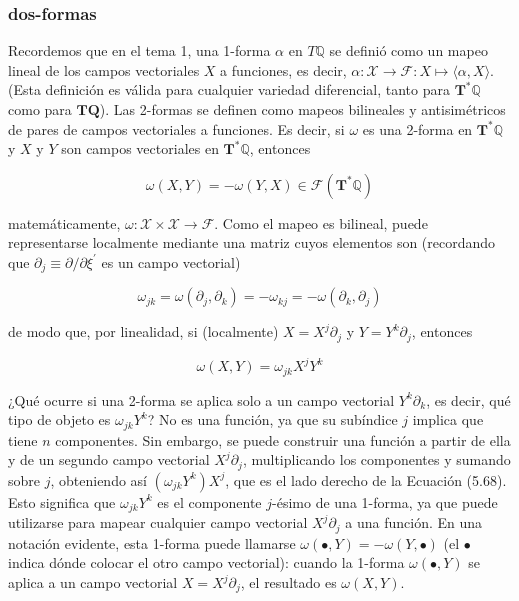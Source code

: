 \subsubsection{dos-formas}
Recordemos que en el tema 1, una 1-forma \( \alpha \) en \( T \mathbb{Q} \) se definió como un mapeo lineal de los campos vectoriales \( X \) a funciones, es decir, \( \alpha: \mathcal{X} \rightarrow \mathcal{F}: X \mapsto \langle \alpha, X \rangle \). (Esta definición es válida para cualquier variedad diferencial, tanto para \( \mathbf{T}^{*} \mathbb{Q} \) como para \( \mathbf{T Q} \)). Las 2-formas se definen como mapeos bilineales y antisimétricos de pares de campos vectoriales a funciones. Es decir, si \( \omega \) es una 2-forma en \( \mathbf{T}^{*} \mathbb{Q} \) y \( X \) y \( Y \) son campos vectoriales en \( \mathbf{T}^{*} \mathbb{Q} \), entonces

$$
\omega(X, Y)=-\omega(Y, X) \in \mathcal{F}\left(\mathbf{T}^{*} \mathbb{Q}\right) \tag{5.66}
$$

matemáticamente, \( \omega: \mathcal{X} \times \mathcal{X} \rightarrow \mathcal{F} \). Como el mapeo es bilineal, puede representarse localmente mediante una matriz cuyos elementos son (recordando que \( \partial_{j} \equiv \partial / \partial \xi^{\prime} \) es un campo vectorial)

$$
\omega_{j k} = \omega\left(\partial_{j}, \partial_{k}\right) = -\omega_{k j} = -\omega\left(\partial_{k}, \partial_{j}\right) \tag{5.67}
$$

de modo que, por linealidad, si (localmente) \( X = X^{j} \partial_{j} \) y \( Y = Y^{k} \partial_{j} \), entonces

$$
\omega(X, Y) = \omega_{j k} X^{j} Y^{k} \tag{5.68}
$$

¿Qué ocurre si una 2-forma se aplica solo a un campo vectorial \( Y^{k} \partial_{k} \), es decir, qué tipo de objeto es \( \omega_{j k} Y^{k} \)? No es una función, ya que su subíndice \( j \) implica que tiene \( n \) componentes. Sin embargo, se puede construir una función a partir de ella y de un segundo campo vectorial \( X^{j} \partial_{j} \), multiplicando los componentes y sumando sobre \( j \), obteniendo así \( \left(\omega_{j k} Y^{k}\right) X^{j} \), que es el lado derecho de la Ecuación (5.68). Esto significa que \( \omega_{j k} Y^{k} \) es el componente \( j \)-ésimo de una 1-forma, ya que puede utilizarse para mapear cualquier campo vectorial \( X^{j} \partial_{j} \) a una función. En una notación evidente, esta 1-forma puede llamarse \( \omega(\bullet, Y) = -\omega(Y, \bullet) \) (el \( \bullet \) indica dónde colocar el otro campo vectorial): cuando la 1-forma \( \omega(\bullet, Y) \) se aplica a un campo vectorial \( X = X^{j} \partial_{j} \), el resultado es \( \omega(X, Y) \).

